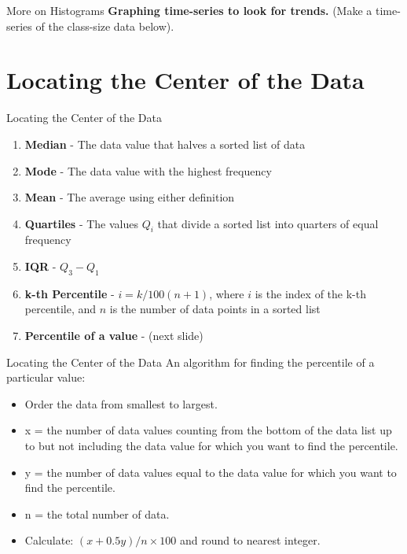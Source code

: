 \documentclass{beamer}
\begin{document}
\begin{frame}{More on Histograms}
\textbf{Graphing time-series to look for trends.} (Make a time-series of the class-size data below). \\ \vspace{6cm}
\end{frame}

\section{Locating the Center of the Data}

\begin{frame}{Locating the Center of the Data}
\begin{enumerate}
\item \textbf{\alert{Median}} - The data value that halves a sorted list of data
\item \textbf{\alert{Mode}} - The data value with the highest frequency
\item \textbf{\alert{Mean}} - The average using either definition
\item \textbf{\alert{Quartiles}} - The values $Q_i$ that divide a sorted list into quarters of equal frequency
\item \textbf{\alert{IQR}} - $Q_3 - Q_1$
\item \textbf{\alert{k-th Percentile}} - $i = k/100 (n+1)$, where $i$ is the index of the k-th percentile, and $n$ is the number of data points in a sorted list
\item \textbf{\alert{Percentile of a value}} - (next slide)
\end{enumerate}
\end{frame}

\begin{frame}{Locating the Center of the Data}
An algorithm for finding the percentile of a particular value:
\begin{itemize}
\item Order the data from smallest to largest.
\item x = the number of data values counting from the bottom of the data list up to but not including the data value for which
you want to find the percentile.
\item y = the number of data values equal to the data value for which you want to find the percentile.
\item n = the total number of data.
\item Calculate: $(x+0.5y)/n \times 100$ and round to nearest integer.
\end{itemize}
\end{frame}
\end{document}
